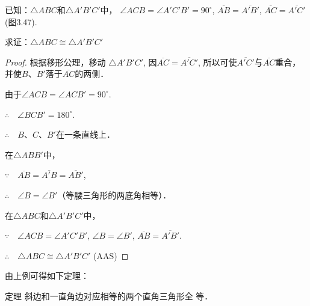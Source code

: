\begin{example}
    已知：$\triangle ABC$和$\triangle A'B'C'$中，
$\angle ACB=\angle A'C'B'=90^{\circ}$, $\overline{AB}=\overline{A'B'}$,
$\overline{AC}=\overline{A'C'}$ (图3.47).

求证：$\triangle ABC\cong \triangle A'B'C'$
\end{example}

\begin{proof}
    根据移形公理，移动
$\triangle A'B'C'$, 因$\overline{AC}=\overline{A'C'}$,
所以可使$\overline{A'C'}$与$\overline{AC}$重合，
并使$B$、$B'$落于$\overline{AC}$的两侧．

由于$\angle ACB=\angle ACB'=90^{\circ}$.

$\therefore\quad \angle  BCB'=180^{\circ}$.

$\therefore\quad B$、$C$、$B'$在一条直线上．

在$\triangle ABB'$中，

$\because\quad \overline{AB}=\overline{A'B}=\overline{AB'}$,

$\therefore\quad \angle B=\angle B'$（等腰三角形的两底角相等）．

在$\triangle ABC$和$\triangle A'B'C'$中，

$\because\quad \angle ACB=\angle A'C'B'$, $\angle B=\angle B'$, $\overline{AB}=\overline{A'B'}$.

$\therefore\quad \triangle ABC\cong \triangle A'B'C'$ (AAS)    
\end{proof}

由上例可得如下定理：

\begin{blk}
  {定理} 斜边和一直角边对应相等的两个直角三角形全
等．  
\end{blk}

